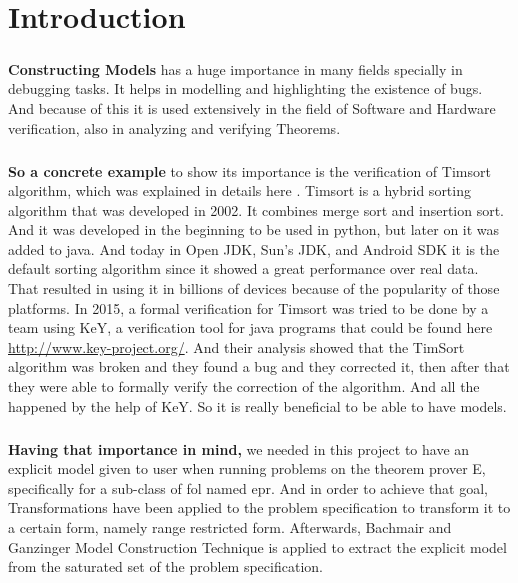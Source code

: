 \chapter{Introduction}\label{chap:intro}

	\nocite{*} 
	
	\paragraph{}
	\textbf{Constructing Models} has a huge importance in many fields specially in debugging tasks. It helps in modelling and highlighting the existence of bugs. And because of this it is used extensively in the field of Software and Hardware verification, also in analyzing and verifying Theorems.

	\paragraph{}
	\textbf{So a concrete example} to show its importance is the verification of Timsort algorithm, which was explained in details here \cite{TIMSORT}. Timsort is a hybrid sorting algorithm that was developed in 2002. It combines merge sort and insertion sort. And it was developed in the beginning to be used in python, but later on it was added to java. And today in Open JDK, Sun's JDK, and Android SDK it is the default sorting algorithm since it showed a great performance over real data. That resulted in using it in billions of devices because of the popularity of those platforms. In 2015, a formal verification for Timsort was tried to be done by a team using KeY, a verification tool for java programs that could be found here \url{http://www.key-project.org/}. And their analysis showed that the TimSort algorithm was broken and they found a bug and they corrected it, then after that they were able to formally verify the correction of the algorithm. And all the happened by the help of KeY. So it is really beneficial to be able to have models.

	\paragraph{}
	\textbf{Having that importance in mind,} we needed in this project to have an explicit model given to user when running problems on the theorem prover E, specifically for a sub-class of \ac{fol} named \ac{epr}. And in order to achieve that goal, Transformations have been applied to the problem specification to transform it to a certain form, namely range restricted form. Afterwards, Bachmair and Ganzinger Model Construction Technique is applied to extract the explicit model from the saturated set of the problem specification. 


